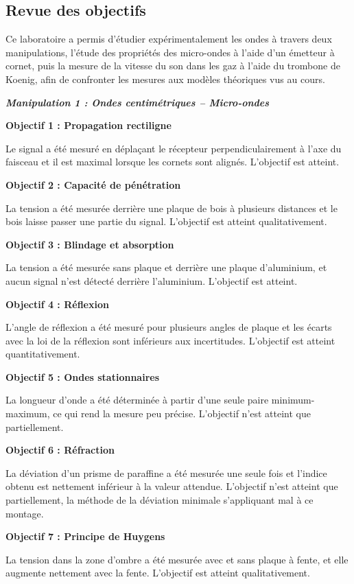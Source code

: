 \subsection{Revue des objectifs}

Ce laboratoire a permis d'étudier expérimentalement les ondes à travers deux manipulations, l'étude des propriétés des micro-ondes à l'aide d'un émetteur à cornet, puis la mesure de la vitesse du son dans les gaz à l'aide du trombone de Koenig, afin de confronter les mesures aux modèles théoriques vus au cours.

\textbf{\textit{Manipulation 1 : Ondes centimétriques -- Micro-ondes}}

\textbf{Objectif 1 : Propagation rectiligne}

Le signal a été mesuré en déplaçant le récepteur perpendiculairement à l'axe du faisceau et il est maximal lorsque les cornets sont alignés. L'objectif est atteint.

\textbf{Objectif 2 : Capacité de pénétration}

La tension a été mesurée derrière une plaque de bois à plusieurs distances et le bois laisse passer une partie du signal. L'objectif est atteint qualitativement.

\textbf{Objectif 3 : Blindage et absorption}

La tension a été mesurée sans plaque et derrière une plaque d'aluminium, et aucun signal n'est détecté derrière l'aluminium. L'objectif est atteint.

\textbf{Objectif 4 : Réflexion}

L'angle de réflexion a été mesuré pour plusieurs angles de plaque et les écarts avec la loi de la réflexion sont inférieurs aux incertitudes. L'objectif est atteint quantitativement.

\textbf{Objectif 5 : Ondes stationnaires}

La longueur d'onde a été déterminée à partir d'une seule paire minimum-maximum, ce qui rend la mesure peu précise. L'objectif n'est atteint que partiellement.

\textbf{Objectif 6 : Réfraction}

La déviation d'un prisme de paraffine a été mesurée une seule fois et l'indice obtenu est nettement inférieur à la valeur attendue. L'objectif n'est atteint que partiellement, la méthode de la déviation minimale s'appliquant mal à ce montage.

\textbf{Objectif 7 : Principe de Huygens}

La tension dans la zone d'ombre a été mesurée avec et sans plaque à fente, et elle augmente nettement avec la fente. L'objectif est atteint qualitativement.

